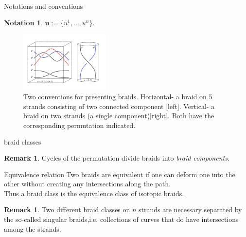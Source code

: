 \documentclass[9pt, english]{beamer}
\theoremstyle{definition}
\newtheorem{oss}[thm]{Remark}
\newtheorem{notation}[thm]{Notation}
\newcommand{\simbolovettore}[1]{{\boldsymbol{#1}}}
\newcommand{\vu}{\simbolovettore{u}}
\begin{document}
\begin{frame}{Notations and conventions}
        \begin{notation}
        $\vu:=\{u^1, \dots, u^n\}$.
        \end{notation}\pause
        \begin{figure}\label{fig:permutation}
        \includegraphics[width=0.4\textwidth]{images/Fig17Wojcik21.pdf}\caption{Two conventions for presenting braids.
        Horizontal- a braid on 5 strands consisting of two connected component [left]. Vertical- a braid on two strands
        (a single component)[right]. Both have the corresponding permutation indicated.}
        \end{figure}
\end{frame}
\begin{frame}{braid classes}
    \begin{oss}
        Cycles of the permutation divide braids into {\em braid
        components.\/}
    \end{oss}\pause
    \begin{block}{Equivalence relation}
        Two braids are equivalent if one can deform one into the other
        without creating any intersections along the path.\pause\\
        \alert{Thus a braid class is the equivalence class of isotopic
        braids.}
    \end{block}\pause
    \begin{oss}
        Two different braid classes on $n$ strands are necessary
        separated by the so-called \alert{singular braids},\pause i.e.
        collections of curves that \alert{do} have intersections
        among the strands.
    \end{oss}
\end{frame}
\end{document}

